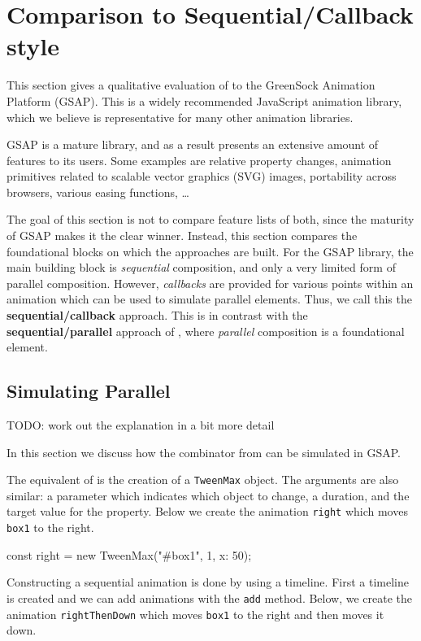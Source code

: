 \section{Comparison to Sequential/Callback style}
\label{sec:evaluation}

This section gives a qualitative evaluation of \dsl{} to the GreenSock Animation Platform (GSAP). This is a widely recommended JavaScript animation library, which we believe is representative for many other animation libraries.

GSAP is a mature library, and as a result presents an extensive amount of features to its users. Some examples are relative property changes, animation primitives related to scalable vector graphics (SVG) images, portability across browsers, various easing functions, \ldots

The goal of this section is not to compare feature lists of both, since the maturity of GSAP makes it the clear winner. Instead, this section compares the foundational blocks on which the approaches are built. For the GSAP library, the main building block is \emph{sequential} composition, and only a very limited form of parallel composition. However, \emph{callbacks} are provided for various points within an animation which can be used to simulate parallel elements. Thus, we call this the \textbf{sequential/callback} approach. This is in contrast with the \textbf{sequential/parallel} approach of \dsl{}, where \emph{parallel} composition is a foundational element.

\subsection{Simulating Parallel}

TODO: work out the explanation in a bit more detail

In this section we discuss how the  combinator from \dsl{} can be simulated in GSAP.

The equivalent of  is the creation of a \texttt{TweenMax} object. The arguments are also similar:  a parameter which indicates which object to change, a duration, and the target value for the property. Below we create the animation \texttt{right} which moves \texttt{box1} to the right.

\begin{js}
const right = new TweenMax("#box1", 1, {x: 50});
\end{js}

Constructing a sequential animation is done by using a timeline. First a timeline is created and we can add animations with the \texttt{add} method. Below, we create the animation \texttt{rightThenDown} which moves \texttt{box1} to the right and then moves it down.

